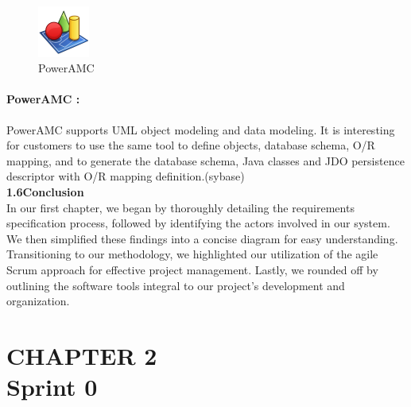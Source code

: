 \documentclass{article}
\begin{document}
\begin{figure}[htbp]
    \centering
    \includegraphics[width=0.15\textwidth]{slm}
    \caption{PowerAMC }
    \label{fig:design6}
\end{figure}
\paragraph{PowerAMC :} 
PowerAMC supports UML object modeling and data modeling. It is interesting for customers to use the same tool to define objects, database schema, O/R mapping, and to generate the database schema, Java classes and JDO persistence descriptor with O/R mapping definition.(sybase)\vspace{1cm}\\
{\Large \textbf{1.6\hspace{1em}Conclusion}}\vspace{0.2cm}\\
In our first chapter, we began by thoroughly detailing the requirements specification process, followed by identifying the actors involved in our system. We then simplified these findings into a concise diagram for easy understanding. Transitioning to our methodology, we highlighted our utilization of the agile Scrum approach for effective project management. Lastly, we rounded off by outlining the software tools integral to our project's development and organization.
\newpage
\section*{\Huge CHAPTER 2\vspace{0.5cm}\\Sprint 0}
\vspace{1.5cm}
\end{document}

